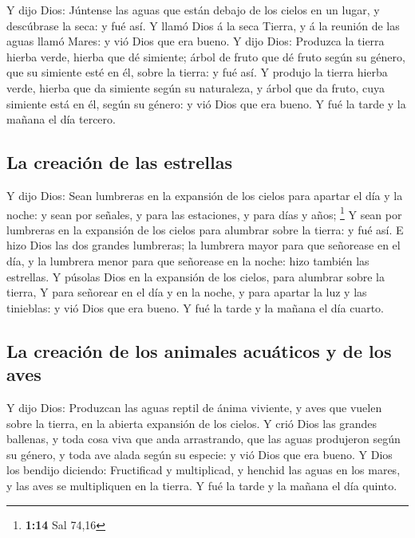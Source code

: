  Y dijo Dios: Júntense las aguas que están debajo de los
cielos en un lugar, y descúbrase la seca: y fué así.  Y
llamó Dios á la seca Tierra, y á la reunión de las aguas llamó Mares: y
vió Dios que era bueno.  Y dijo Dios: Produzca la tierra
hierba verde, hierba que dé simiente; árbol de fruto que dé fruto según
su género, que su simiente esté en él, sobre la tierra: y fué así.
 Y produjo la tierra hierba verde, hierba que da simiente
según su naturaleza, y árbol que da fruto, cuya simiente está en él,
según su género: y vió Dios que era bueno.  Y fué la
tarde y la mañana el día tercero.

\hypertarget{la-creaciuxf3n-de-las-estrellas}{%
\subsection{La creación de las
estrellas}\label{la-creaciuxf3n-de-las-estrellas}}

 Y dijo Dios: Sean lumbreras en la expansión de los
cielos para apartar el día y la noche: y sean por señales, y para las
estaciones, y para días y años; \footnote{\textbf{1:14} Sal 74,16}
 Y sean por lumbreras en la expansión de los cielos para
alumbrar sobre la tierra: y fué así.  E hizo Dios las dos
grandes lumbreras; la lumbrera mayor para que señorease en el día, y la
lumbrera menor para que señorease en la noche: hizo también las
estrellas.  Y púsolas Dios en la expansión de los cielos,
para alumbrar sobre la tierra,  Y para señorear en el día
y en la noche, y para apartar la luz y las tinieblas: y vió Dios que era
bueno.  Y fué la tarde y la mañana el día cuarto.

\hypertarget{la-creaciuxf3n-de-los-animales-acuuxe1ticos-y-de-los-aves}{%
\subsection{La creación de los animales acuáticos y de los
aves}\label{la-creaciuxf3n-de-los-animales-acuuxe1ticos-y-de-los-aves}}

 Y dijo Dios: Produzcan las aguas reptil de ánima
viviente, y aves que vuelen sobre la tierra, en la abierta expansión de
los cielos.  Y crió Dios las grandes ballenas, y toda
cosa viva que anda arrastrando, que las aguas produjeron según su
género, y toda ave alada según su especie: y vió Dios que era bueno.
 Y Dios los bendijo diciendo: Fructificad y multiplicad,
y henchid las aguas en los mares, y las aves se multipliquen en la
tierra.  Y fué la tarde y la mañana el día quinto.

